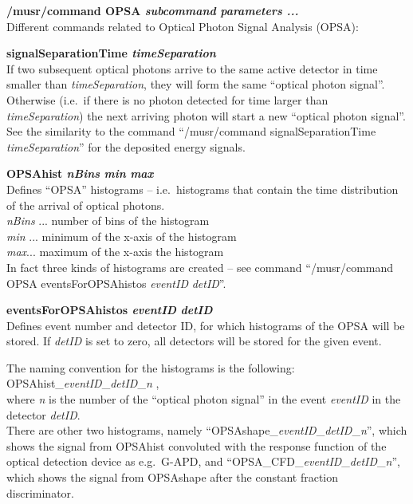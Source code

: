 \documentclass[twoside]{dis04}
\begin{document}
\begin{description}
\item {\bf /musr/command OPSA \emph{subcommand} \emph{parameters ...}}\\
       Different commands related to Optical Photon Signal Analysis (OPSA):\\
       \begin{description}
	   \item{\bf signalSeparationTime \emph{timeSeparation}} \\
	        If two subsequent optical photons arrive to the same active detector
		in time smaller than \emph{timeSeparation}, they will form
		the same ``optical photon signal''.  Otherwise (i.e.\ if there is no photon
		detected for time larger than \emph{timeSeparation}) the next arriving photon
		will start a new ``optical photon signal''.  See the similarity
		to the command ``/musr/command signalSeparationTime \emph{timeSeparation}''
		for the deposited energy signals.
	    \item{\bf OPSAhist \emph{nBins} \emph{min} \emph{max}} \\
	        Defines ``OPSA'' histograms -- i.e.\ histograms that
		contain the time distribution of the arrival of optical photons.\\
		\emph{nBins} ... number of bins of the histogram\\
		\emph{min} ... minimum of the x-axis of the histogram\\
		\emph{max}... maximum of the x-axis the histogram\\
	
		In fact three kinds of histograms are created -- see command
		``/musr/command OPSA eventsForOPSAhistos \emph{eventID} \emph{detID}''.

	    \item{\bf eventsForOPSAhistos \emph{eventID} \emph{detID}}\\
	        Defines event number and detector ID, for which histograms of the
		OPSA will be stored.  If \emph{detID} is set to zero, all detectors will be
		stored for the given event.
		
		The naming convention for the histograms is the following:
		OPSAhist\_\emph{eventID}\_\emph{detID}\_\emph{n} ,\\ 
		where \emph{n} is the number of the ``optical photon signal'' in the
                event \emph{eventID} in the detector \emph{detID}.\\
		There are other two histograms, namely 
		``OPSAshape\_\emph{eventID}\_\emph{detID}\_\emph{n}'', which shows
		the signal from OPSAhist convoluted with the response function
		of the optical detection device as e.g.\ G-APD, and 
		``OPSA\_CFD\_\emph{eventID}\_\emph{detID}\_\emph{n}'', which shows
		the signal from OPSAshape after the constant fraction discriminator.


\end{description}
\end{description}
\end{document}
